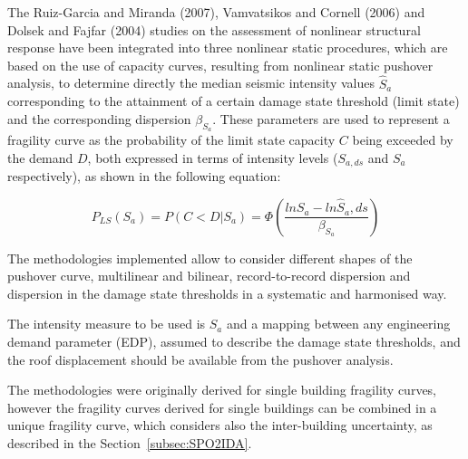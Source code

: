 The Ruiz-Garcia and Miranda (2007), Vamvatsikos and Cornell (2006) and Dolsek and Fajfar (2004) studies on the assessment of nonlinear structural response have been integrated into three nonlinear static procedures, which are based on the use of capacity curves, resulting from nonlinear static pushover analysis, to determine directly the median seismic intensity values $\hat{S}_a$ corresponding to the attainment of a certain damage state threshold (limit state) and the corresponding dispersion $\beta_{S_a}$. These parameters are used to represent a fragility curve as the probability of the limit state capacity $C$ being exceeded by the demand $D$, both expressed in terms of intensity levels ($S_{a,ds}$ and $S_a$ respectively), as shown in the following equation:

\begin{equation}
P_{LS}(S_a) = P(C < D | S_a) = \Phi(\frac{ln S_a -ln \hat{S}_a, ds}{\beta_{S_a}})
\label{eq:fragility-definition}
\end{equation}

The methodologies implemented allow to consider different shapes of the pushover curve, multilinear and bilinear, record-to-record dispersion and dispersion in the damage state thresholds in a systematic and harmonised way.

The intensity measure to be used is $S_a$ and a mapping between any engineering demand parameter (EDP), assumed to describe the damage state thresholds, and the roof displacement should be available from the pushover analysis.

The methodologies were originally derived for single building fragility curves, however the fragility curves derived for single buildings can be combined in a unique fragility curve, which considers also the inter-building uncertainty, as described in the Section~\ref{subsec:SPO2IDA}.
